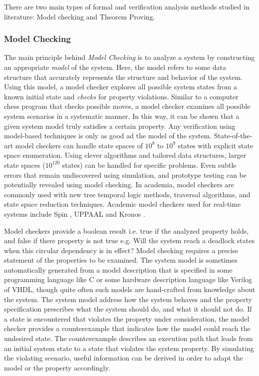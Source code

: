 There are two main types of formal and verification analysis methods studied in literature: Model checking and Theorem Proving.

\subsubsection{Model Checking}


The main principle behind \emph{Model Checking} is to analyze a system by constructing an appropriate \emph{model} of the system. Here, the model refers to some data structure that accurately represents the structure and behavior of the system. Using this model, a model checker explores all possible system states from a known initial state and \emph{checks} for property violations. Similar to a computer chess program that checks possible moves, a model checker examines all possible system scenarios in a systematic manner. In this way, it can be shown that a given system model truly satisfies a certain property. Any verification using model-based techniques is only as good ad the model of the system. State-of-the-art model checkers can handle state spaces of $10^8$ to $10^9$ states with explicit state space enumeration. Using clever algorithms and tailored data structures, larger state spaces ($10^{120}$ states) can be handled for specific problems. Even subtle errors that remain undiscovered using simulation, and prototype testing can be potentially revealed using model checking. In academia, model checkers are commonly used with new tree temporal logic methods, traversal algorithms, and state space reduction techniques. Academic model checkers used for real-time systems include Spin \cite{holzmann2004spin}, UPPAAL \cite{larsen1997uppaal} and Kronos \cite{yovine1997kronos}. 

Model checkers provide a boolean result i.e. true if the analyzed property holds, and false if there property is not true e.g. Will the system reach a deadlock states when this circular dependency is in effect? Model checking requires a precise statement of the properties to be examined. The system model is sometimes automatically generated from a model description that is specified in some programming language like C or some hardware description language like Verilog of VHDL, though quite often such models are hand-crafted from knowledge about the system. The system model address how the system behaves and the property specification prescribes what the system should do, and what it should not do. If a state is encountered that violates the property under consideration, the model checker provides a counterexample that indicates how the model could reach the undesired state. The counterexample describes an execution path that leads from an initial system state to a state that violates the system property. By simulating the violating scenario, useful information can be derived in order to adapt the model or the property accordingly. 

